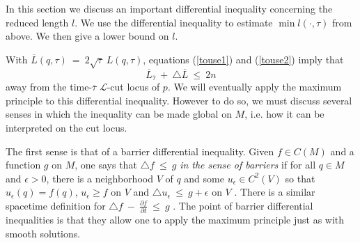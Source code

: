 In this section we discuss an important differential inequality
concerning the reduced length $l$. We use the differential
inequality to estimate  $\min l(\cdot, \tau)$ from above.
We then give a lower bound on $l$.

With $\overline{L}(q, \tau) \: = \: 2 \sqrt{\tau} \: L(q, \tau)$,
equations (\ref{touse1}) and (\ref{touse2}) imply that
\begin{equation} \label{barrier}
\overline{L}_{\overline{\tau}} \: + \: \triangle \overline{L}
\: \le \: 2n
\end{equation}
away from the time-$\overline{\tau}$
${\mathcal L}$-cut locus of $p$.
We will eventually apply the maximum principle to this
differential inequality.  However to do so, we must
discuss several  senses in which
the inequality can be made global on $M$, i.e. how it can be interpreted
on the cut locus.

The first sense is that of a barrier differential inequality.
Given $f \in C(M)$ and a function $g$ on $M$, one says that
$\triangle f \: \le \: g$ {\em in the sense of barriers}
if for all $q \in M$ and $\epsilon > 0$,
there is a neighborhood $V$ of $q$ and some $u_\epsilon \in C^2(V)$ so that
 $u_\epsilon(q) = f(q)$, $u_\epsilon \ge f$ on $V$ and
$\triangle u_\epsilon \: \le \: g + \epsilon$ on $V$
\cite{Calabi}.
There is a similar spacetime definition for
$\triangle f \: -\: \frac{\partial f}{\partial t} \: \le \: g$
\cite{Dodziuk}. The point of barrier differential inequalities is
that they allow one to apply the maximum principle just as with
smooth solutions.

